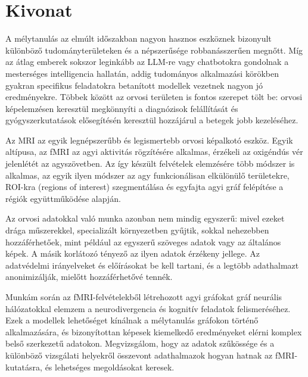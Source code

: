 \setcounter{page}{1}

\selecthungarian

\chapter*{Kivonat}

A mélytanulás az elmúlt időszakban nagyon hasznos eszköznek bizonyult különböző tudományterületeken és a népszerűsége robbanásszerűen megnőtt. Míg az átlag emberek sokszor leginkább az LLM-re vagy chatbotokra gondolnak a mesterséges intelligencia hallatán, addig tudományos alkalmazási körökben gyakran specifikus feladatokra betanított modellek vezetnek nagyon jó eredményekre. Többek között az orvosi területen is fontos szerepet tölt be: orvosi képelemzésen keresztül megkönnyíti a diagnózisok felállítását és gyógyszerkutatások elősegítésén keresztül hozzájárul a betegek jobb kezeléséhez.

Az MRI az egyik legnépszerűbb és legismertebb orvosi képalkotó eszköz. Egyik altípusa, az fMRI az agyi aktivitás rögzítésére alkalmas, érzékeli az oxigéndús vér jelenlétét az agyszövetben. Az így készült felvételek elemzésére több módszer is alkalmas, az egyik ilyen módszer az agy funkcionálisan elkülönülő területekre, ROI-kra (regions of interest) szegmentálása és egyfajta agyi gráf felépítése a régiók együttműködése alapján.

Az orvosi adatokkal való munka azonban nem mindig egyszerű: mivel ezeket drága műszerekkel, specializált környezetben gyűjtik, sokkal nehezebben hozzáférhetőek, mint például az egyszerű szöveges adatok vagy az általános képek. A másik korlátozó tényező az ilyen adatok érzékeny jellege. Az adatvédelmi irányelveket és előírásokat be kell tartani, és a legtöbb adathalmazt anonimizálják, mielőtt hozzáférhetővé tennék.

Munkám során az fMRI-felvételekből létrehozott agyi gráfokat gráf neurális hálózatokkal elemzem a neurodivergencia és kognitív feladatok felismeréséhez. Ezek a modellek lehetőséget kínálnak a mélytanulás gráfokon történő alkalmazására, és bizonyítottan képesek kiemelkedő eredményeket elérni komplex belső szerkezetű adatokon. Megvizsgálom, hogy az adatok szűkössége és a különböző vizsgálati helyekről összevont adathalmazok hogyan hatnak az fMRI-kutatásra, és lehetséges megoldásokat keresek.

